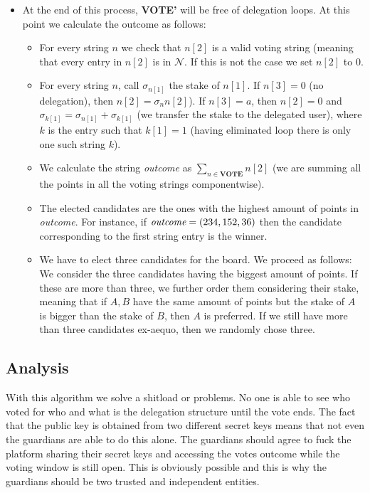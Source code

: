 \documentclass[submission, copyright,creativecommons,sharealike,noncommercial]{eptcs}
\begin{document}
\begin{itemize}
\begin{itemize}
				\item At the end of this process, \textbf{VOTE'} will be free of delegation loops. At this point we calculate the outcome as follows:
					\begin{itemize}
						\item For every string $n$ we check that $n[2]$ is a valid voting string (meaning that every entry in $n[2]$ is in $\mathcal{N}$. If this is not the case we set $n[2]$ to $0$.
					
						\item For every string $n$, call $\sigma_{n[1]}$ the stake of $n[1]$. If $n[3] = 0$ (no delegation), then $n[2] = \sigma_n n[2]$). If $n[3] = a$, then $n[2] = 0$ and $\sigma_{k[1]} = \sigma_{n[1]} + \sigma_{k[1]}$ (we transfer the stake to the delegated user), where $k$ is the entry such that $k[1] = 1$ (having eliminated loop there is only one such string $k$).
						
						
						\item We calculate the string \emph{outcome} as $\sum_{n \in \textbf{VOTE}} n[2]$ (we are summing all the points in all the voting strings componentwise).
						
						\item The elected candidates are the ones with the highest amount of points in \emph{outcome}. For instance, if $\emph{outcome} = (234, 152, 36)$ then the candidate corresponding to the first string entry is the winner.
						
						\item We have to elect three candidates for the board. We proceed as follows: We consider the three candidates having the biggest amount of points. If these are more than three, we further order them considering their stake, meaning that if $A,B$ have the same amount of points but the stake of $A$ is bigger than the stake of $B$, then $A$ is preferred. If we still have more than three candidates ex-aequo, then we randomly chose three.
					\end{itemize}
				\end{itemize}
			\end{itemize}

	\subsection{Analysis}
		With this algorithm we solve a shitload or problems. No one is able to see who voted for who and what is the delegation structure until the vote ends. The fact that the public key is obtained from two different secret keys means that not even the guardians are able to do this alone. The guardians should agree to fuck the platform sharing their secret keys and accessing the votes outcome while the voting window is still open. This is obviously possible and this is why the guardians should be two trusted and independent entities.
		
\end{document}
